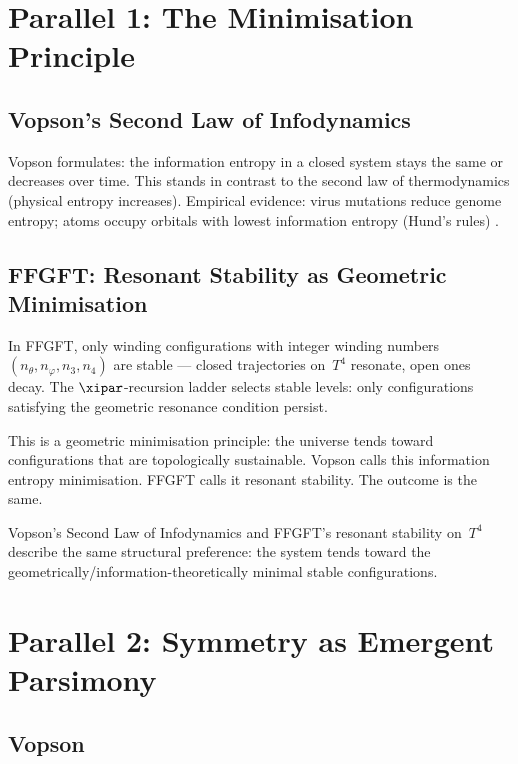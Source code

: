\section{Parallel 1: The Minimisation Principle}

\subsection{Vopson's Second Law of Infodynamics}

Vopson formulates: the information entropy in a closed system stays the same
or decreases over time. This stands in contrast to the second law of
thermodynamics (physical entropy increases). Empirical evidence: virus
mutations reduce genome entropy; atoms occupy orbitals with lowest information
entropy (Hund's rules) \cite{Vopson2023}.

\subsection{FFGFT: Resonant Stability as Geometric Minimisation}

In FFGFT, only winding configurations with integer winding numbers
$(n_\theta, n_\varphi, n_3, n_4)$ are stable --- closed trajectories on~$T^4$
resonate, open ones decay. The $\xipar$-recursion ladder selects stable levels:
only configurations satisfying the geometric resonance condition persist.

This is a geometric minimisation principle: the universe tends toward
configurations that are topologically sustainable. Vopson calls this
information entropy minimisation. FFGFT calls it resonant stability. The
outcome is the same.

\begin{erkenntnis}
Vopson's Second Law of Infodynamics and FFGFT's resonant stability on~$T^4$
describe the same structural preference: the system tends toward the
geometrically/information-theoretically minimal stable configurations.
\end{erkenntnis}

\section{Parallel 2: Symmetry as Emergent Parsimony}

\subsection{Vopson}

